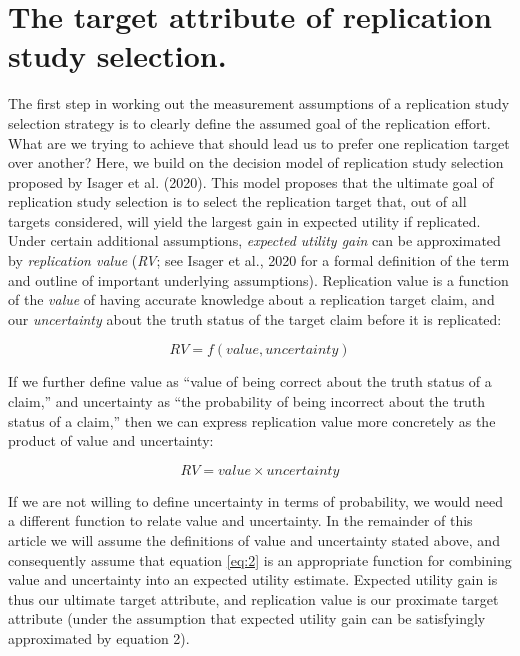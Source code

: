 \documentclass[
  english,
  jou,floatsintext]{apa6}
\begin{document}
\hypertarget{the-target-attribute-of-replication-study-selection.}{%
\section{The target attribute of replication study selection.}\label{the-target-attribute-of-replication-study-selection.}}

The first step in working out the measurement assumptions of a replication study selection strategy is to clearly define the assumed goal of the replication effort. What are we trying to achieve that should lead us to prefer one replication target over another? Here, we build on the decision model of replication study selection proposed by Isager et al. (2020). This model proposes that the ultimate goal of replication study selection is to select the replication target that, out of all targets considered, will yield the largest gain in expected utility if replicated. Under certain additional assumptions, \emph{expected utility gain} can be approximated by \emph{replication value} (\emph{RV}; see Isager et al., 2020 for a formal definition of the term and outline of important underlying assumptions). Replication value is a function of the \emph{value} of having accurate knowledge about a replication target claim, and our \emph{uncertainty} about the truth status of the target claim before it is replicated:

\begin{equation} 
  \tag{1}
  RV=f(value, uncertainty)
  \label{eq:1}
\end{equation}

If we further define value as ``value of being correct about the truth status of a claim,'' and uncertainty as ``the probability of being incorrect about the truth status of a claim,'' then we can express replication value more concretely as the product of value and uncertainty:

\begin{equation} 
  \tag{2}
  RV=value\times uncertainty
  \label{eq:2}
\end{equation}

If we are not willing to define uncertainty in terms of probability, we would need a different function to relate value and uncertainty. In the remainder of this article we will assume the definitions of value and uncertainty stated above, and consequently assume that equation \eqref{eq:2} is an appropriate function for combining value and uncertainty into an expected utility estimate. Expected utility gain is thus our ultimate target attribute, and replication value is our proximate target attribute (under the assumption that expected utility gain can be satisfyingly approximated by equation 2).
\end{document}
